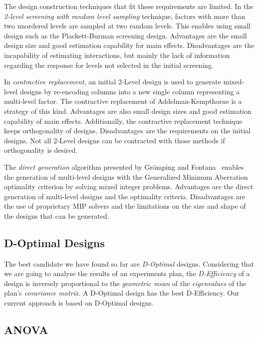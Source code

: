 \documentclass[conference]{IEEEtran}
\begin{document}
The design construction techniques that fit these requirements are limited.  In
the \emph{2-level screening with random level sampling} technique, factors
with more than two unordered levels are sampled at two random levels. This
enables using small design such as the Plackett-Burman screening design.
Advantages are the small design size and good estimation capability for main
effects. Disadvantages are the incapability of estimating interactions, but
mainly the lack of information regarding the response for levels not selected
in the initial screening.

In \emph{contractive replacement}, an initial 2-Level design is used to
generate mixed-level designs by re-encoding columns into a new single column
representing a multi-level factor. The contractive replacement of
Addelman-Kempthorne is a strategy of this kind.  Advantages are also small
design sizes and good estimation capability of main effects. Additionally, the
contractive replacement technique keeps orthogonality of designs.
Disadvantages are the requirements on the initial designs. Not all 2-Level
designs can be contracted with those methods if orthogonality is desired.

The \emph{direct generation} algorithm presented by Grömping and
Fontana~\cite{ulrike2018algorithm} enables the generation of multi-level
designs with the Generalized Minimum Aberration optimality criterion by solving
mixed integer problems. Advantages are the direct generation of multi-level
designs and the optimality criteria. Disadvantages are the use of proprietary
MIP solvers and the limitations on the size and shape of the designs that can be
generated.
\subsection{D-Optimal Designs}
\label{sec:org118aa47}
The best candidate we have found so far are \emph{D-Optimal} designs. Considering
that we are going to analyse the results of an experiments plan, the
\emph{D-Efficiency} of a design is inversely proportional to the \emph{geometric mean} of
the \emph{eigenvalues} of the plan's \emph{covariance matrix}. A D-Optimal design has the
best D-Efficiency. Our current approach is based on D-Optimal designs.
\subsection{ANOVA}
\label{sec:orgf287022}
\end{document}
